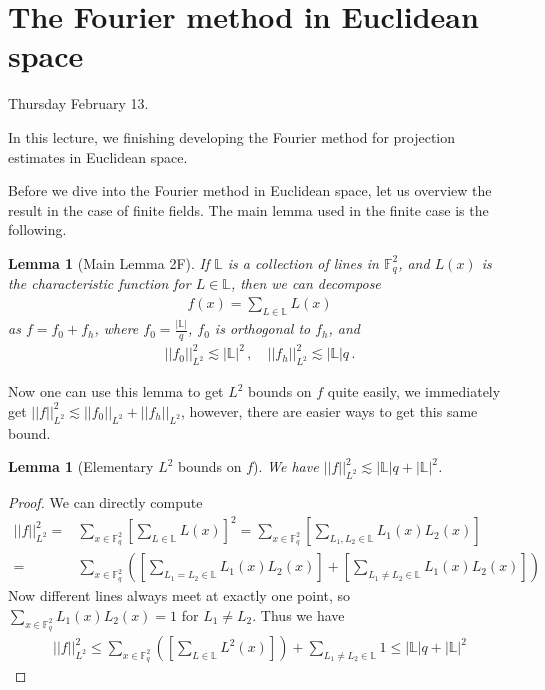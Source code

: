 \documentclass[12pt]{amsart}
\newtheorem{lemma}[theorem]{Lemma}
\newcommand{\FF}{\mathbb{F}}
\newcommand{\LL}{\mathbb{L}}
\begin{document}
\newpage

\section{The Fourier method in Euclidean space}

Thursday February 13.

In this lecture,  we finishing developing the Fourier method for projection estimates in Euclidean space.

Before we dive into the Fourier method in Euclidean space, let us overview the result in the case of finite fields.
The main lemma used in the finite case is the following.
\begin{lemma} [Main Lemma 2F]
    If $\LL$ is a collection of lines in $\FF_q^2$, and $L(x)$ is the characteristic function for $L \in \LL$, then we can decompose
    \begin{align*}
        f(x) = \sum_{L \in \LL} L(x)
    \end{align*}
    as $f = f_0 + f_h$, where $f_0 = \frac{|\LL|}{q}$, $f_0$ is orthogonal to $f_h$, and 
    \begin{align*}
        ||f_0||^2_{L^2} \lesssim |\LL|^2 \, , \quad ||f_h||^2_{L^2} \lesssim |\LL| q\, .
    \end{align*}
\end{lemma}
Now one can use this lemma to get $L^2$ bounds on $f$ quite easily, we immediately get $||f||^2_{L^2} \lesssim ||f_0||_{L^2} + ||f_h||_{L^2}$, however, there are easier ways to get this same bound.
\begin{lemma}[Elementary $L^2$ bounds on $f$]
    We have $||f||^2_{L^2} \lesssim |\LL| q + |\LL|^2$.
\end{lemma}
\begin{proof}
    We can directly compute
    \begin{align*}
        ||f||^2_{L^2} =& \sum_{x \in \FF_q^2} \left[\sum_{L \in \LL} L(x)\right]^2
        = \sum_{x \in \FF_q^2} \left[\sum_{L_1,L_2 \in \LL} L_1(x)L_2(x)\right]
        \\
        =& \sum_{x \in \FF_q^2} \left(\left[\sum_{L_1=L_2 \in \LL} L_1(x)L_2(x)\right]
        +
        \left[\sum_{L_1 \neq L_2 \in \LL} L_1(x)L_2(x)\right]
        \right)
    \end{align*}
    Now different lines always meet at exactly one point, so $\sum_{x \in \FF_q^2} L_1 (x) L_2 (x) = 1$ for $L_1 \neq L_2$. Thus we have
    \begin{align*}
        ||f||^2_{L^2} \leq \sum_{x \in \FF_q^2} \left(\left[\sum_{L \in \LL} L^2(x)\right]\right)
        +
        \sum_{L_1 \neq L_2 \in \LL} 1 \leq |\LL| q + |\LL|^2
    \end{align*}
\end{proof}
\end{document}
